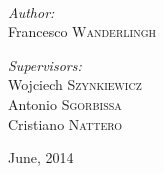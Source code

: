 \begin{titlepage}
\begin{center}
~\\[0.6cm]

\begin{minipage}{0.5\textwidth}
\begin{flushleft} \large
\emph{Author:}\\
Francesco \textsc{Wanderlingh}
\end{flushleft}
\end{minipage}
\hfill	
\begin{minipage}{0.4\textwidth}
\begin{flushright} \large
\emph{Supervisors:} \\
Wojciech \textsc{Szynkiewicz} \\
Antonio \textsc{Sgorbissa} \\
Cristiano \textsc{Nattero}
\end{flushright}
\end{minipage}

\vfill


{\large June, 2014}

\end{center}
\end{titlepage}